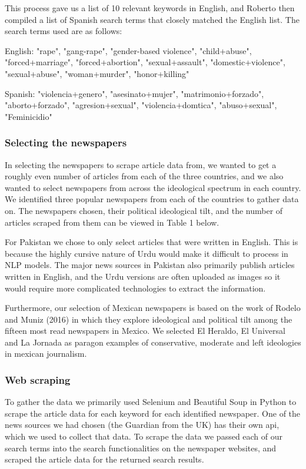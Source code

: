 \documentclass{article}
\begin{document}
{{{This process gave us a list of 10 relevant keywords in English, and Roberto then compiled a list of Spanish search terms that closely matched the English list. The search terms used are as follows:

English: "rape", "gang-rape", "gender-based violence", "child+abuse", "forced+marriage", "forced+abortion", "sexual+assault", "domestic+violence", "sexual+abuse", "woman+murder", "honor+killing"

Spanish: "violencia+genero", "asesinato+mujer", "matrimonio+forzado", "aborto+forzado", "agresion+sexual", "violencia+domtica", "abuso+sexual", "Feminicidio"
                }
\subsubsection{Selecting the newspapers}{ 
In selecting the newspapers to scrape article data from, we wanted to get a roughly even number of articles from each of the three countries, and we also wanted to select newspapers from across the ideological spectrum in each country. We identified three popular newspapers from each of the countries to gather data on. The newspapers chosen, their political ideological tilt, and the number of articles scraped from them can be viewed in Table 1 below.

For Pakistan we chose to only select articles that were written in English. This is because the highly cursive nature of Urdu would make it difficult to process in NLP models. The major news sources in Pakistan also primarily publish articles written in English, and the Urdu versions are often uploaded as images so it would require more complicated technologies to extract the information.

Furthermore, our selection of Mexican newspapers is based on the work of Rodelo and Muniz (2016) in which they explore ideological and political tilt among the fifteen most read newspapers in Mexico. We selected El Heraldo, El Universal and La Jornada as paragon examples of conservative, moderate and left ideologies in mexican journalism.}

\subsubsection{Web scraping}{
To gather the data we primarily used Selenium and Beautiful Soup in Python to scrape the article data for each keyword for each identified newspaper. One of the news sources we had chosen (the Guardian from the UK) has their own api, which we used to collect that data. To scrape the data we passed each of our search terms into the search functionalities on the newspaper websites, and scraped the article data for the returned search results. 

}}}
\end{document}
